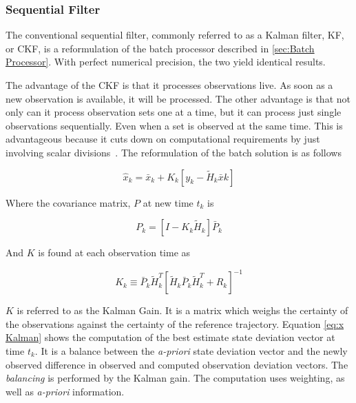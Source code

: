 \documentclass[12pt,a4paper,oneside]{article}
\numberwithin{equation}{section}   		%
\begin{document}

\subsubsection{Sequential Filter}
\label{sec:Sequential Filter}

The conventional sequential filter, commonly referred to as a Kalman filter, KF, or CKF, is a reformulation of the batch processor described in \ref{sec:Batch Processor}. With perfect numerical precision, the two yield identical results. 

The advantage of the CKF is that it processes observations live. As soon as a new observation is available, it will be processed. The other advantage is that not only can it process observation sets one at a time, but it can process just single observations sequentially. Even when a set is observed at the same time. This is advantageous because it cuts down on computational requirements by just involving scalar divisions~\cite{tapley2004statistical}. The reformulation of the batch solution is as follows

\begin{equation}
	\hat{x}_k = \bar{x}_k + K_k [ y_k - \tilde{H}_k \bar{x}k ]
	\label{eq:x Kalman}
\end{equation}

Where the covariance matrix, $P$ at new time $t_k$ is

\begin{equation}
	P_k = [I - K_k \tilde{H}_k] \bar{P}_k
	\label{eq:P Kalman}
\end{equation}

And $K$ is found at each observation time as

\begin{equation}
	K_k \equiv \bar{P}_k \tilde{H}_k^T [ \tilde{H}_k \bar{P}_k \tilde{H}_k^T + R_k]^{-1}
	\label{eq:K Kalman}
\end{equation}

$K$ is referred to as the Kalman Gain. It is a matrix which weighs the certainty of the observations against the certainty of the reference trajectory. Equation \eqref{eq:x Kalman} shows the computation of the best estimate state deviation vector at time $t_k$. It is a balance between the \emph{a-priori} state deviation vector and the newly observed difference in observed and computed observation deviation vectors. The \emph{balancing} is performed by the Kalman gain. The computation uses weighting, as well as \emph{a-priori} information. 
\end{document}
